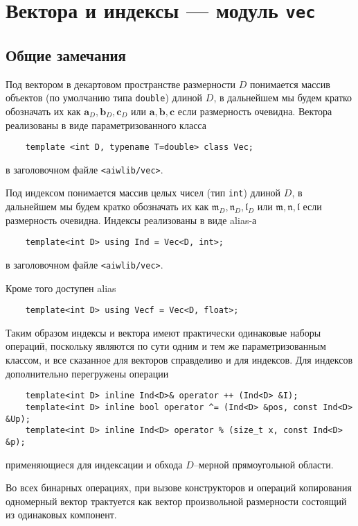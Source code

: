 \def\Ind#1{\mathfrak{#1}}
\def\l{\Ind{l}}
\def\m{\Ind{m}}
\def\n{\Ind{n}}
\def\Vec#1{\mathbf{#1}}
\def\a{\Vec{a}}
\def\b{\Vec{b}}
\def\c{\Vec{c}}


\section{Вектора и индексы --- модуль {\tt vec}}
\subsection{Общие замечания}
 Под вектором в декартовом пространстве размерности $D$ понимается массив объектов
(по умолчанию типа {\tt double}) длиной $D$, в
дальнейшем мы будем кратко обозначать их как $\a_D, \b_D, \c_D$ или $\a, \b,
\c$ если размерность очевидна.
Вектора реализованы в виде
параметризованного класса 
\begin{verbatim}
	template <int D, typename T=double> class Vec;
\end{verbatim}
в заголовочном файле {\tt <aiwlib/vec>}.

Под индексом понимается массив целых чисел (тип {\tt int}) длиной $D$, в
дальнейшем мы будем кратко обозначать их как $\m_D, \n_D, \l_D$ или $\m, \n,
\l$ если размерность очевидна. Индексы реализованы в виде alias-а
\begin{verbatim}
	template<int D> using Ind = Vec<D, int>;
\end{verbatim}
в заголовочном файле {\tt <aiwlib/vec>}.

Кроме того доступен alias
\begin{verbatim}
	template<int D> using Vecf = Vec<D, float>;
\end{verbatim}

Таким образом индексы и вектора имеют практически одинаковые наборы операций, поскольку 
являются по сути одним и тем же параметризованным классом, и все сказанное для векторов справделиво и для индексов.
Для индексов дополнительно перегружены операции
\begin{verbatim}
	template<int D> inline Ind<D>& operator ++ (Ind<D> &I);
	template<int D> inline bool operator ^= (Ind<D> &pos, const Ind<D> &Up);
	template<int D> inline Ind<D> operator % (size_t x, const Ind<D> &p);
\end{verbatim}
применяющиеся для индексации и обхода $D$--мерной прямоугольной области.

Во всех бинарных операциях, при вызове конструкторов и операций копирования 
одномерный вектор трактуется как вектор произвольной размерности состоящий из одинаковых компонент.

